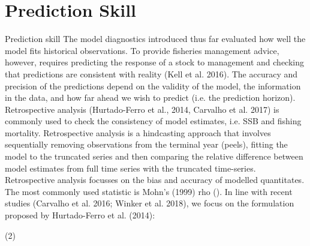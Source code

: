 
\section{Prediction Skill}

Prediction skill
The model diagnostics introduced thus far evaluated how well the model fits historical observations. To provide fisheries management advice, however, requires predicting the response of a stock to management and checking that predictions are consistent with reality (Kell et al. 2016). The accuracy and precision of the predictions depend on the validity of the model, the information in the data, and how far ahead we wish to predict (i.e. the prediction horizon). 
Retrospective analysis  (Hurtado-Ferro et al., 2014, Carvalho et al. 2017) is commonly used to check the consistency of model estimates, i.e. SSB and fishing mortality. Retrospective analysis is a hindcasting approach that involves sequentially removing  observations from the terminal year (peels), fitting the model to the truncated series and then comparing the relative difference between model estimates from full time series with the truncated time-series. Retrospective analysis focusses on the bias and accuracy of modelled quantitates. The most commonly used statistic is Mohn’s (1999) rho (). In line with recent studies (Carvalho et al. 2016; Winker et al. 2018), we focus on the formulation proposed by Hurtado-Ferro et al. (2014): 

					(2)

